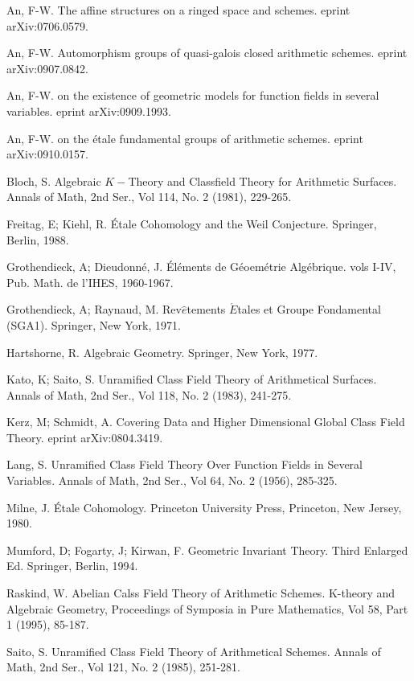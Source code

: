 \documentclass[12pt,twoside,reqno]{amsart}
\theoremstyle{definition}
\numberwithin{equation}{section}
\begin{document}
\begin{thebibliography}{99}
 An, F-W. The affine structures on a ringed space and schemes.
eprint arXiv:0706.0579.

 An, F-W. Automorphism groups of quasi-galois closed arithmetic
schemes. eprint arXiv:0907.0842.

 An, F-W. on the existence of geometric models for function
fields in several variables. eprint arXiv:0909.1993.

 An, F-W. on the \'{e}tale fundamental groups of arithmetic
schemes. eprint arXiv:0910.0157.

 Bloch, S. Algebraic $K-$Theory and Classfield Theory for
Arithmetic Surfaces. Annals of Math, 2nd Ser., Vol 114, No. 2 (1981),
229-265.

 Freitag, E; Kiehl, R. \'{E}tale Cohomology and the Weil
Conjecture. Springer, Berlin, 1988.

 Grothendieck, A; Dieudonn\'{e}, J. \'{E}l\'{e}ments de G\'{e}oem\'{e}trie Alg\'{e}brique. vols I-IV, Pub. Math. de l'IHES, 1960-1967.

 Grothendieck, A; Raynaud, M. Rev$\hat{e}$tements $\acute{E}$tales et Groupe Fondamental (SGA1). Springer, New York, 1971.

 Hartshorne, R. Algebraic Geometry. Springer, New York, 1977.

 Kato, K; Saito, S. Unramified Class Field Theory of
Arithmetical Surfaces. Annals of Math, 2nd Ser., Vol 118, No. 2 (1983),
241-275.

 Kerz, M; Schmidt, A. Covering Data and Higher Dimensional
Global Class Field Theory. eprint arXiv:0804.3419.

 Lang, S. Unramified Class Field Theory Over Function Fields
in Several Variables. Annals of Math, 2nd Ser., Vol 64, No. 2 (1956),
285-325.

 Milne, J. \'{E}tale Cohomology. Princeton University Press,
Princeton, New Jersey, 1980.

 Mumford, D; Fogarty, J; Kirwan, F. Geometric Invariant Theory.
Third Enlarged Ed. Springer, Berlin, 1994.

 Raskind, W. Abelian Calss Field Theory of Arithmetic
Schemes. K-theory and Algebraic Geometry, Proceedings of Symposia in Pure
Mathematics, Vol 58, Part 1 (1995), 85-187.

 Saito, S. Unramified Class Field Theory of Arithmetical
Schemes. Annals of Math, 2nd Ser., Vol 121, No. 2 (1985), 251-281.


\end{thebibliography}
\end{document}

